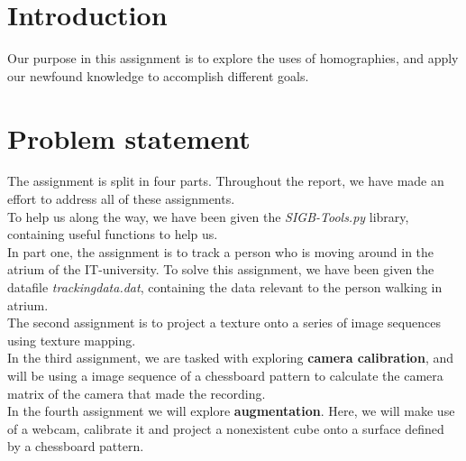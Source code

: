 \section{Introduction}
Our purpose in this assignment is to explore the uses of homographies, and apply our newfound knowledge to accomplish different goals.\newline

\section{Problem statement}

The assignment is split in four parts. Throughout the report, we have made an effort to address all of these assignments.\\

To help us along the way, we have been given the \textsl{SIGB-Tools.py} library, containing useful functions to help us.\\

In part one, the assignment is to track a person who is moving around in the atrium of the IT-university. To solve this assignment, we have been given the datafile \textsl{trackingdata.dat}, containing the data relevant to the person walking in atrium.\\

The second assignment is to project a texture onto a series of image sequences using texture mapping.\\

In the third assignment, we are tasked with exploring \textbf{camera calibration}, and will be using a image sequence of a chessboard pattern to calculate the camera matrix of the camera that made the recording.\\

In the fourth assignment we will explore \textbf{augmentation}. Here, we will make use of a webcam, calibrate it and project a nonexistent cube onto a surface defined by a chessboard pattern.